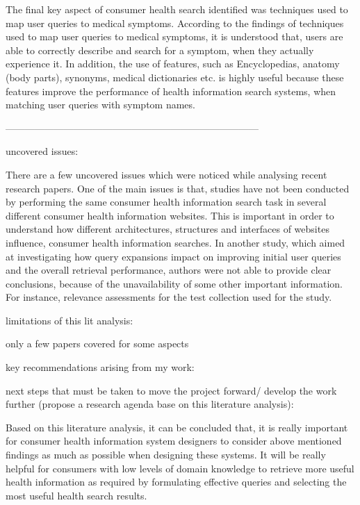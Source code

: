 \documentclass[]{article}
\begin{document}
The final key aspect of consumer health search identified was techniques used to map user queries to medical symptoms. According to the findings of techniques used to map user queries to medical symptoms, it is understood that, users are able to correctly describe and search for a symptom, when they actually experience it. In addition, the use of features, such as Encyclopedias, anatomy (body parts), synonyms, medical dictionaries etc. is highly useful because these features improve the performance of health information search systems, when matching user queries with symptom names.      

------------------------------------------------------------------------------

uncovered issues: 

There are a few uncovered issues which were noticed while analysing recent research papers. One of the main issues is that, studies have not been conducted by performing the same consumer health information search task in several different consumer health information websites. This is important in order to understand how different architectures, structures and interfaces of websites influence, consumer health information searches. In another study, which aimed at investigating how query expansions impact on improving initial user queries and the overall retrieval performance, authors were not able to provide clear conclusions, because of the unavailability of some other important information. For instance, relevance assessments for the test collection used for the study.   
 

limitations of this lit analysis:

only a few papers covered for some aspects




key recommendations arising from my work:

next steps that must be taken to move the project forward/ develop the work further (propose a research agenda base on this literature analysis):

Based on this literature analysis, it can be concluded that, it is really important for consumer health information system designers to consider above mentioned findings as much as possible when designing these systems. It will be really helpful for consumers with low levels of domain knowledge to retrieve more useful health information as required by formulating effective queries and selecting the most useful health search results.   
\end{document}
